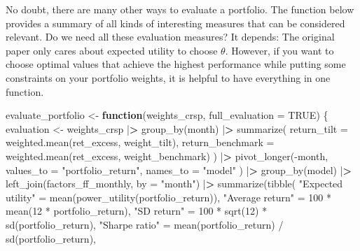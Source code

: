 \documentclass[
]{krantz}
\newenvironment{Shaded}{\begin{snugshade}}{\end{snugshade}}
\newcommand{\AttributeTok}[1]{\textcolor[rgb]{0.61,0.61,0.61}{#1}}
\newcommand{\ConstantTok}[1]{\textcolor[rgb]{0,0,0}{#1}}
\newcommand{\ControlFlowTok}[1]{\textcolor[rgb]{0.27,0.27,0.27}{\textbf{#1}}}
\newcommand{\DecValTok}[1]{\textcolor[rgb]{0.06,0.06,0.06}{#1}}
\newcommand{\ErrorTok}[1]{\textcolor[rgb]{0.14,0.14,0.14}{\textbf{#1}}}
\newcommand{\FunctionTok}[1]{\textcolor[rgb]{0,0,0}{#1}}
\newcommand{\NormalTok}[1]{#1}
\newcommand{\OtherTok}[1]{\textcolor[rgb]{0.37,0.37,0.37}{#1}}
\newcommand{\SpecialCharTok}[1]{\textcolor[rgb]{0,0,0}{#1}}
\newcommand{\StringTok}[1]{\textcolor[rgb]{0.5,0.5,0.5}{#1}}
\begin{document}
No doubt, there are many other ways to evaluate a portfolio. The function below provides a summary of all kinds of interesting measures that can be considered relevant. Do we need all these evaluation measures? It depends: The original paper \citet{Brandt2009} only cares about expected utility to choose \(\theta\). However, if you want to choose optimal values that achieve the highest performance while putting some constraints on your portfolio weights, it is helpful to have everything in one function.

\begin{Shaded}
\begin{Highlighting}[]
\NormalTok{evaluate\_portfolio }\OtherTok{\textless{}{-}} \ControlFlowTok{function}\NormalTok{(weights\_crsp,}
                               \AttributeTok{full\_evaluation =} \ConstantTok{TRUE}\NormalTok{) \{}
\NormalTok{  evaluation }\OtherTok{\textless{}{-}}\NormalTok{ weights\_crsp }\SpecialCharTok{|}\ErrorTok{\textgreater{}}
    \FunctionTok{group\_by}\NormalTok{(month) }\SpecialCharTok{|}\ErrorTok{\textgreater{}}
    \FunctionTok{summarize}\NormalTok{(}
      \AttributeTok{return\_tilt =} \FunctionTok{weighted.mean}\NormalTok{(ret\_excess, weight\_tilt),}
      \AttributeTok{return\_benchmark =} \FunctionTok{weighted.mean}\NormalTok{(ret\_excess, weight\_benchmark)}
\NormalTok{    ) }\SpecialCharTok{|}\ErrorTok{\textgreater{}}
    \FunctionTok{pivot\_longer}\NormalTok{(}\SpecialCharTok{{-}}\NormalTok{month,}
      \AttributeTok{values\_to =} \StringTok{"portfolio\_return"}\NormalTok{,}
      \AttributeTok{names\_to =} \StringTok{"model"}
\NormalTok{    ) }\SpecialCharTok{|}\ErrorTok{\textgreater{}}
    \FunctionTok{group\_by}\NormalTok{(model) }\SpecialCharTok{|}\ErrorTok{\textgreater{}}
    \FunctionTok{left\_join}\NormalTok{(factors\_ff\_monthly, }\AttributeTok{by =} \StringTok{"month"}\NormalTok{) }\SpecialCharTok{|}\ErrorTok{\textgreater{}}
    \FunctionTok{summarize}\NormalTok{(}\FunctionTok{tibble}\NormalTok{(}
      \StringTok{"Expected utility"} \OtherTok{=} \FunctionTok{mean}\NormalTok{(}\FunctionTok{power\_utility}\NormalTok{(portfolio\_return)),}
      \StringTok{"Average return"} \OtherTok{=} \DecValTok{100} \SpecialCharTok{*} \FunctionTok{mean}\NormalTok{(}\DecValTok{12} \SpecialCharTok{*}\NormalTok{ portfolio\_return),}
      \StringTok{"SD return"} \OtherTok{=} \DecValTok{100} \SpecialCharTok{*} \FunctionTok{sqrt}\NormalTok{(}\DecValTok{12}\NormalTok{) }\SpecialCharTok{*} \FunctionTok{sd}\NormalTok{(portfolio\_return),}
      \StringTok{"Sharpe ratio"} \OtherTok{=} \FunctionTok{mean}\NormalTok{(portfolio\_return) }\SpecialCharTok{/} \FunctionTok{sd}\NormalTok{(portfolio\_return),}

\end{Highlighting}
\end{Shaded}
\end{document}

